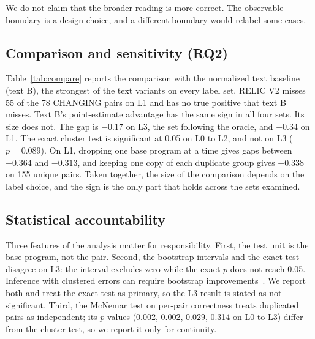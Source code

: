 \documentclass[conference]{IEEEtran}
\begin{document}
We do not claim that the broader reading is more correct. The observable boundary is a design choice, and a different boundary would relabel some cases.

\subsection{Comparison and sensitivity (RQ2)}
Table~\ref{tab:compare} reports the comparison with the normalized text baseline (text B), the strongest of the text variants on every label set. RELIC V2 misses 55 of the 78 CHANGING pairs on L1 and has no true positive that text B misses. Text B's point-estimate advantage has the same sign in all four sets. Its size does not. The gap is $-0.17$ on L3, the set following the oracle, and $-0.34$ on L1. The exact cluster test is significant at 0.05 on L0 to L2, and not on L3 ($p=0.089$). On L1, dropping one base program at a time gives gaps between $-0.364$ and $-0.313$, and keeping one copy of each duplicate group gives $-0.338$ on 155 unique pairs. Taken together, the size of the comparison depends on the label choice, and the sign is the only part that holds across the sets examined.

\begin{table}[t]
\caption{MCC of RELIC V2 and normalized text B under four label sets. Intervals are 95\% cluster bootstrap over 16 base programs. $\Delta$ is RELIC V2 minus text B, with exact cluster-level $p$.}
\label{tab:compare}
\centering
\small
{}
\end{table}

\subsection{Statistical accountability}
Three features of the analysis matter for responsibility. First, the test unit is the base program, not the pair. Second, the bootstrap intervals and the exact test disagree on L3: the interval excludes zero while the exact $p$ does not reach 0.05. Inference with clustered errors can require bootstrap improvements~\cite{cameron2008}. We report both and treat the exact test as primary, so the L3 result is stated as not significant. Third, the McNemar test on per-pair correctness treats duplicated pairs as independent; its $p$-values (0.002, 0.002, 0.029, 0.314 on L0 to L3) differ from the cluster test, so we report it only for continuity.
\end{document}
